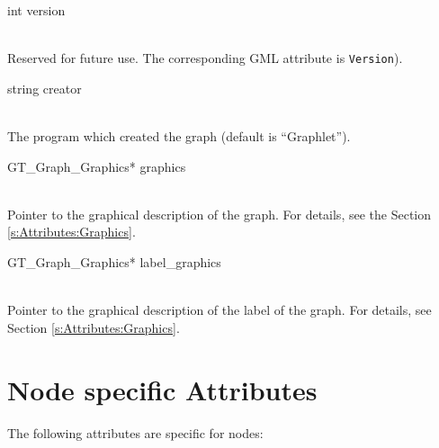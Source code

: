 \documentclass[twoside,fleqn]{report}
\begin{document}
\begin{CAttributes}

  \item[int version] \strut\\
  Reserved for future use.  The corresponding GML attribute is 
  \texttt{Version}).
  
  \item[string creator] \strut\\
  The program which created the graph (default is ``Graphlet'').
  
  \item[GT\_Graph\_Graphics* graphics] \strut\\
  Pointer to the graphical description of the graph.  For details, see 
  the Section \ref{s:Attributes:Graphics}.
  
  \item[GT\_Graph\_Graphics* label\_graphics] \strut\\
  Pointer to the graphical description of the label of the graph.  For 
  details, see Section \ref{s:Attributes:Graphics}.
  
\end{CAttributes}


%
%

\section{Node specific Attributes}
\label{s:Attributes:Node}

The following attributes are specific for nodes:
\end{document}
